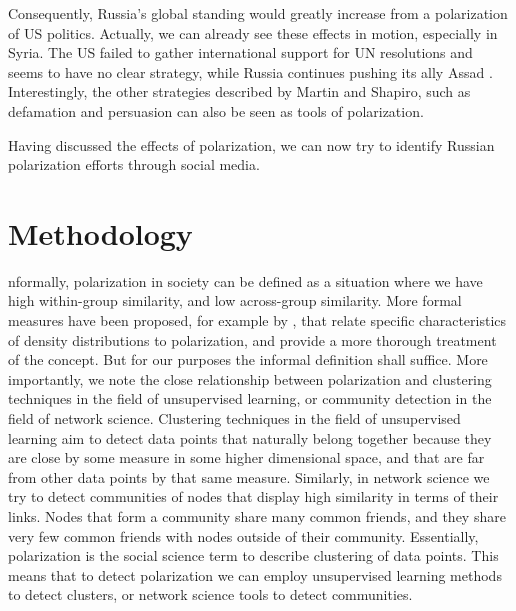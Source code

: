 \documentclass[12pt, authoryear]{elsarticle}
\begin{document}
Consequently, Russia's global standing would greatly increase from a polarization of US politics. Actually, we can already see these effects in motion, especially in Syria. The US failed to gather international support for UN resolutions and seems to have no clear strategy, while Russia continues pushing its ally Assad \citep{bolan_2019}. Interestingly, the other strategies described by Martin and Shapiro, such as defamation and persuasion can also be seen as tools of polarization. 

Having discussed the effects of polarization, we can now try to identify Russian polarization efforts through social media. 

\section{Methodology}
nformally, polarization in society can be defined as a situation where we have high within-group similarity, and low across-group similarity. More formal measures have been proposed, for example by \cite{duclos2004polarization}, that relate specific characteristics of density distributions to polarization, and provide a more thorough treatment of the concept. But for our purposes the informal definition shall suffice. More importantly, we note the close relationship between polarization and clustering techniques in the field of unsupervised learning, or community detection in the field of network science. Clustering techniques in the field of unsupervised learning aim to detect data points that naturally belong together because they are close by some measure in some higher dimensional space, and that are far from other data points by that same measure. Similarly, in network science we try to detect communities of nodes that display high similarity in terms of their links. Nodes that form a community share many common friends, and they share very few common friends with nodes outside of their community. Essentially, polarization is the social science term to describe clustering of data points. This means that to detect polarization we can employ unsupervised learning methods to detect clusters, or network science tools to detect communities.
\end{document}
